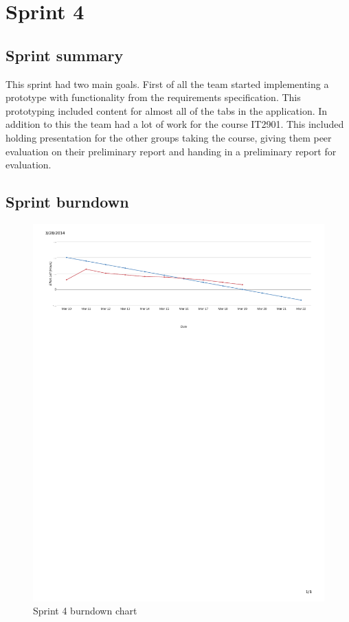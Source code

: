 \section{Sprint 4}
\subsection{Sprint summary}
This sprint had two main goals. First of all the team started implementing a prototype with functionality from the requirements specification. This prototyping included content for almost all of the tabs in the application. In addition to this the team had a lot of work for the course IT2901. This included holding presentation for the other groups taking the course, giving them peer evaluation on their preliminary report and handing in a preliminary report for evaluation.

\subsection{Sprint burndown}


\begin{figure}[H]
\includegraphics[width=\textwidth, trim= 1cm 21cm 1cm 1cm, clip=true]{ch/projectManagement/fig/burndown4.pdf}
\caption{Sprint 4 burndown chart}
\label{fig:sprint4burndown}
\end{figure}


